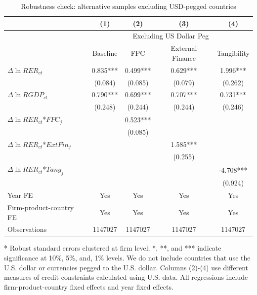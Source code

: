 \documentclass[12pt]{article}
\begin{document}
\begin{table}[htbp]
	\centering
	\caption{Robustness check: alternative samples excluding USD-pegged countries}
	\begin{threeparttable}
	\begin{tabular}{lcccc}
		\toprule
		& (1)   & (2)   & (3)   & (4) \\
		\midrule
		& \multicolumn{4}{c}{Excluding US Dollar Peg} \\
		& Baseline & FPC   & External Finance & Tangibility \\
		\midrule
		$\Delta \ln RER_{ct}$ & 0.835*** & 0.499*** & 0.629*** & 1.996*** \\
		& (0.084) & (0.085) & (0.079) & (0.262) \\
		$\Delta \ln RGDP_{ct}$ & 0.790*** & 0.699*** & 0.707*** & 0.731*** \\
		& (0.248) & (0.244) & (0.244) & (0.246) \\
		$\Delta \ln RER_{ct}$*$FPC_{j}$ & & 0.523*** &       &  \\
            & &(0.085) &       &  \\
		$\Delta \ln RER_{ct}$*$ExtFin_{j}$ &  &     & 1.585*** &  \\
		& &      & (0.255) &  \\
		$\Delta \ln RER_{ct}$*$Tang_{j}$ & &       &       & -4.708*** \\
		& &       &       & (0.924) \\
		Year FE  &   Yes    & Yes   & Yes   & Yes \\
		Firm-product-country FE &   Yes    & Yes   & Yes   & Yes \\
		Observations & 1147027 & 1147027 & 1147027 & 1147027 \\
		\bottomrule
	\end{tabular}
	\begin{tablenotes}
		\footnotesize
		\item[*] Robust standard errors clustered at firm level; *, **, and *** indicate significance at 10\%, 5\%, and, 1\% levels. We do not include countries that use the U.S. dollar or currencies pegged to the U.S. dollar. Columns (2)-(4) use different measures of credit constraints calculated using U.S. data. All regressions include firm-product-country fixed effects and year fixed effects.
	\end{tablenotes}
        \end{threeparttable}
        \label{tab.robust.nopeg}
\end{table}
\end{document}
